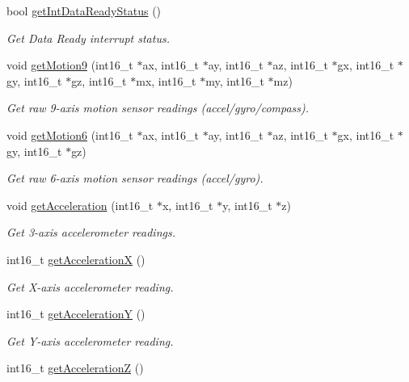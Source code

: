 \begin{DoxyCompactItemize}
bool \mbox{\hyperlink{classMPU6050_ae4f434eb51a15b536e2e8f89a776872b}{get\+Int\+Data\+Ready\+Status}} ()
\begin{DoxyCompactList}\small\item\em Get Data Ready interrupt status. \end{DoxyCompactList}\item 
void \mbox{\hyperlink{classMPU6050_aabfd2920e748016383e8124a4b32ad31}{get\+Motion9}} (int16\+\_\+t $\ast$ax, int16\+\_\+t $\ast$ay, int16\+\_\+t $\ast$az, int16\+\_\+t $\ast$gx, int16\+\_\+t $\ast$gy, int16\+\_\+t $\ast$gz, int16\+\_\+t $\ast$mx, int16\+\_\+t $\ast$my, int16\+\_\+t $\ast$mz)
\begin{DoxyCompactList}\small\item\em Get raw 9-\/axis motion sensor readings (accel/gyro/compass). \end{DoxyCompactList}\item 
void \mbox{\hyperlink{classMPU6050_a574d3093dc131e4251a9b37adf208ca7}{get\+Motion6}} (int16\+\_\+t $\ast$ax, int16\+\_\+t $\ast$ay, int16\+\_\+t $\ast$az, int16\+\_\+t $\ast$gx, int16\+\_\+t $\ast$gy, int16\+\_\+t $\ast$gz)
\begin{DoxyCompactList}\small\item\em Get raw 6-\/axis motion sensor readings (accel/gyro). \end{DoxyCompactList}\item 
void \mbox{\hyperlink{classMPU6050_a658dfc7e35b7fdba360a75f137bde33a}{get\+Acceleration}} (int16\+\_\+t $\ast$x, int16\+\_\+t $\ast$y, int16\+\_\+t $\ast$z)
\begin{DoxyCompactList}\small\item\em Get 3-\/axis accelerometer readings. \end{DoxyCompactList}\item 
int16\+\_\+t \mbox{\hyperlink{classMPU6050_aa68475158c22128e5459c4c5e19439dc}{get\+AccelerationX}} ()
\begin{DoxyCompactList}\small\item\em Get X-\/axis accelerometer reading. \end{DoxyCompactList}\item 
int16\+\_\+t \mbox{\hyperlink{classMPU6050_a27240b90d3e03c85b7a619b794bb1756}{get\+AccelerationY}} ()
\begin{DoxyCompactList}\small\item\em Get Y-\/axis accelerometer reading. \end{DoxyCompactList}\item 
int16\+\_\+t \mbox{\hyperlink{classMPU6050_acf5f5a20c10d99a1bdedf139f897bfdf}{get\+AccelerationZ}} ()

\end{DoxyCompactItemize}
